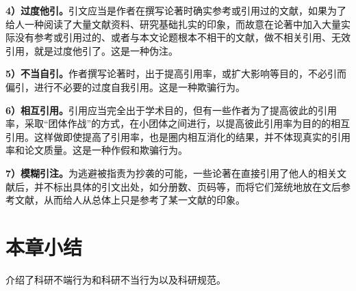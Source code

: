 \textbf{4）过度他引。}引文应当是作者在撰写论著时确实参考或引用过的文献，如果为了给人一种阅读了大量文献资料、研究基础扎实的印象，而故意在论著中加入大量实际没有参考或引用过的、或者与本文论题根本不相干的文献，做不相关引用、无效引用，就是过度他引了。这是一种伪注。

\textbf{5）不当自引。}作者撰写论著时，出于提高引用率，或扩大影响等目的，不必引而偏引，进行不必要的过度自我引用。这是一种欺骗行为。

\textbf{6）相互引用。}引用应当完全出于学术目的，但有一些作者为了提高彼此的引用率，采取“团体作战”的方式，在小团体之间进行，以提高彼此引用率为目的的相互引用。这样做即使提高了引用率，也是圈内相互消化的结果，并不体现真实的引用率和论文质量。这是一种作假和欺骗行为。

\textbf{7）模糊引注。}为逃避被指责为抄袭的可能，一些论著在直接引用了他人的相关文献后，并不标出具体的引文出处，如分册数、页码等，而将它们笼统地放在文后参考文献，从而给人从总体上只是参考了某一文献的印象。

\section{本章小结}

介绍了科研不端行为和科研不当行为以及科研规范。










